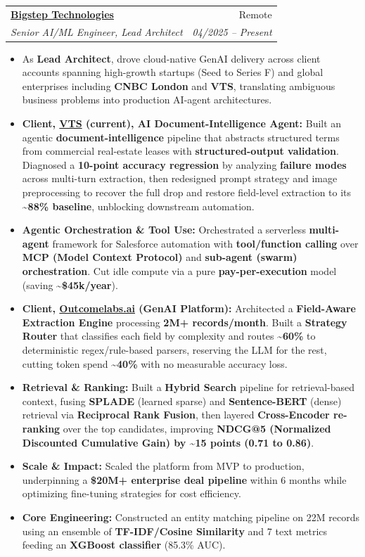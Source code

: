 \documentclass[11pt,a4paper]{article}
\makeatletter
\newcommand{\resumeItem}[1]{
  \item\small{
    {#1 \vspace{-2pt}}
  }
}
\newcommand{\resumeSubheading}[4]{
  \vspace{-1pt}\item
    \begin{tabular*}{0.97\textwidth}[t]{l@{\extracolsep{\fill}}r}
      \textbf{#1} & #2 \\
      \textit{\small#3} & \textit{\small #4} \\
    \end{tabular*}\vspace{-5pt}
}
\newcommand{\resumeItemListStart}{\begin{itemize}[itemsep=2pt, topsep=0pt, partopsep=0pt]}
\newcommand{\resumeItemListEnd}{\end{itemize}\vspace{-5pt}}
\makeatother
\begin{document}
    \resumeSubheading
      {\href{https://bigsteptech.com/}{Bigstep Technologies}}{Remote}
      {Senior AI/ML Engineer, Lead Architect}{04/2025 -- Present}
      \resumeItemListStart
        \resumeItem{As \textbf{Lead Architect}, drove cloud-native GenAI delivery across client accounts spanning high-growth startups (Seed to Series F) and global enterprises including \textbf{CNBC London} and \textbf{VTS}, translating ambiguous business problems into production AI-agent architectures.}
        \resumeItem{\textbf{Client, \href{https://www.vts.com/}{VTS} (current), AI Document-Intelligence Agent:} Built an agentic \textbf{document-intelligence} pipeline that abstracts structured terms from commercial real-estate leases with \textbf{structured-output validation}. Diagnosed a \textbf{10-point accuracy regression} by analyzing \textbf{failure modes} across multi-turn extraction, then redesigned prompt strategy and image preprocessing to recover the full drop and restore field-level extraction to its \textbf{\textasciitilde{}88\% baseline}, unblocking downstream automation.}
        \resumeItem{\textbf{Agentic Orchestration \& Tool Use:} Orchestrated a serverless \textbf{multi-agent} framework for Salesforce automation with \textbf{tool/function calling} over \textbf{MCP (Model Context Protocol)} and \textbf{sub-agent (swarm) orchestration}. Cut idle compute via a pure \textbf{pay-per-execution} model (saving \textbf{\textasciitilde{}\$45k/year}).}
        \resumeItem{\textbf{Client, \href{https://www.outcomelabs.ai/}{Outcomelabs.ai} (GenAI Platform):} Architected a \textbf{Field-Aware Extraction Engine} processing \textbf{2M+ records/month}. Built a \textbf{Strategy Router} that classifies each field by complexity and routes \textbf{\textasciitilde{}60\%} to deterministic regex/rule-based parsers, reserving the LLM for the rest, cutting token spend \textbf{\textasciitilde{}40\%} with no measurable accuracy loss.}
        \resumeItem{\textbf{Retrieval \& Ranking:} Built a \textbf{Hybrid Search} pipeline for retrieval-based context, fusing \textbf{SPLADE} (learned sparse) and \textbf{Sentence-BERT} (dense) retrieval via \textbf{Reciprocal Rank Fusion}, then layered \textbf{Cross-Encoder re-ranking} over the top candidates, improving \textbf{NDCG@5 (Normalized Discounted Cumulative Gain) by \textasciitilde{}15 points (0.71 to 0.86)}.}
        \resumeItem{\textbf{Scale \& Impact:} Scaled the platform from MVP to production, underpinning a \textbf{\$20M+ enterprise deal pipeline} within 6 months while optimizing fine-tuning strategies for cost efficiency.}
        \resumeItem{\textbf{Core Engineering:} Constructed an entity matching pipeline on 22M records using an ensemble of \textbf{TF-IDF/Cosine Similarity} and 7 text metrics feeding an \textbf{XGBoost classifier} (85.3\% AUC).}
      \resumeItemListEnd
\end{document}
